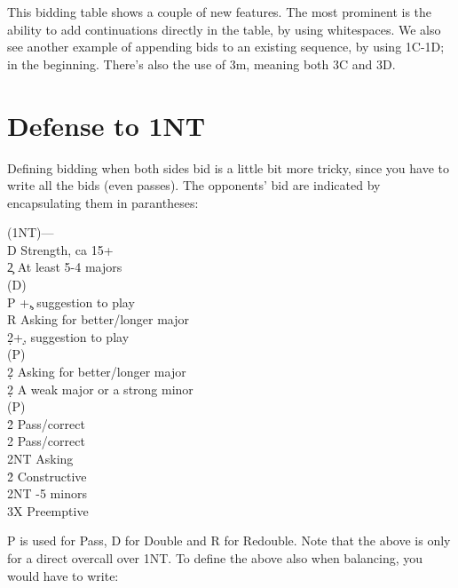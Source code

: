 \documentclass[a4paper]{article}
\begin{document}
This bidding table shows a couple of new features. The most
prominent is the ability to add continuations directly in the
table, by using whitespaces. We also see another example of
appending bids to an existing sequence, by using 1C-1D; in the
beginning. There's also the use of 3m, meaning both 3C and 3D.

\section{Defense to 1NT}

Defining bidding when both sides bid is a little bit more tricky,
since you have to write all the bids (even passes). The opponents'
bid are indicated by encapsulating them in parantheses:

\begin{bidtable}
(1NT)---\\
D \> Strength, ca 15+\\
2\c \> At least 5-4 majors\+\\
(D)\+\\
P +\c, suggestion to play\\
R \> Asking for better/longer major\\
2\d {}+\d, suggestion to play\-\\
(P)\+\\
2\d \> Asking for better/longer major\-\-\\
2\d \> A weak major or a strong minor\+\\
(P)\+\\
2\h \> Pass/correct\\
2\s \> Pass/correct\\
2NT \> Asking\-\-\\
2\h\s \> Constructive\\
2NT -5 minors\\
3X \> Preemptive
\end{bidtable}

P is used for Pass, D for Double and R for Redouble. Note that the
above is only for a direct overcall over 1NT. To define the above
also when balancing, you would have to write:
\end{document}
